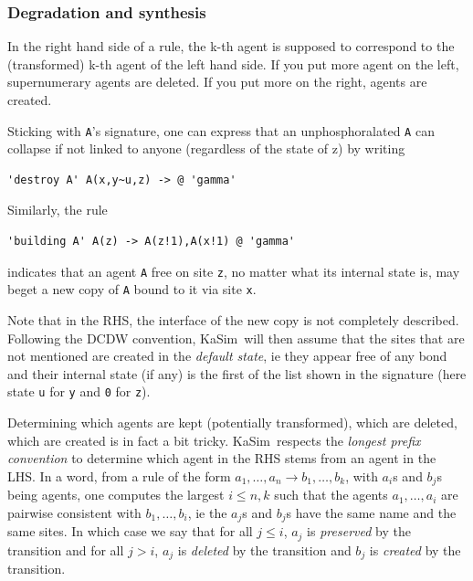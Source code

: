 \documentclass[11pt]{book}
\def\KaSim{\textsf{KaSim}}
\def\ttt#1{\texttt{#1}}
\def\rar{\rightarrow}
\def\ie{ie }
\def\via{via }
\begin{document}
\subsubsection*{Degradation and synthesis}
In the right hand side of a rule, the k-th agent is supposed to
correspond to the (transformed) k-th agent of the left hand side. If
you put more agent on the left, supernumerary agents are deleted. If
you put more on the right, agents are created.

Sticking with \ttt{A}'s signature, one can
express that an unphosphoralated \ttt{A} can collapse if not linked to
anyone (regardless of the state of z) by writing
\begin{lstlisting}[language=kappa]
'destroy A' A(x,y~u,z) -> @ 'gamma'
\end{lstlisting}

Similarly, the rule
\begin{lstlisting}[language=kappa]
'building A' A(z) -> A(z!1),A(x!1) @ 'gamma'
\end{lstlisting}
indicates that an agent \ttt{A} free on site \ttt{z}, no matter what
its internal state is, may beget a new copy of \ttt{A} bound to it
\via site \ttt{x}.

Note that in the RHS, the interface of the new copy is not completely
described. Following the DCDW convention, \KaSim~will then assume that the sites that are not
mentioned are created in the \emph{default state}, \ie they appear free of any bond and their internal state
(if any) is the first of the list shown in the signature (here state \ttt{u} for \ttt{y} and \ttt{0} for \ttt{z}).

Determining which agents are kept (potentially transformed), which
are deleted, which are created is in fact a bit tricky.
\KaSim~respects the \emph{longest prefix convention} to determine which agent in the RHS stems from an
agent in the LHS.  In a word, from a rule of the form
$a_1,\dots,a_n\rar b_1,\dots,b_k$, with $a_i$s and $b_j$s being
agents, one computes the largest $i\leq n,k$ such that the agents
$a_1,\dots,a_i$ are pairwise consistent with $b_1,\dots,b_i$, \ie the
$a_j$s and $b_j$s have the same name and the same sites. In which case
we say that for all $j\leq i$, $a_j$ is \emph{preserved} by the
transition and for all $j>i$, $a_j$ is \emph{deleted} by the
transition and $b_j$ is \emph{created} by the transition.
\end{document}
